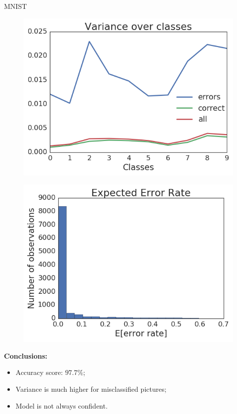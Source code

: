 \documentclass{beamer}
\begin{document}
\begin{frame}{MNIST}
	\begin{minipage}[t]{0.45\columnwidth}
		\begin{figure}
			\includegraphics[width=1\columnwidth]{pres_pics/mnist_variance}
		\end{figure}
	\end{minipage}
	\hfill
	\begin{minipage}[t]{0.46\columnwidth}
		\begin{figure}
			\includegraphics[width=1\columnwidth]{pres_pics/mnist_eer}
		\end{figure}
	\end{minipage}

	\vfill

	\textbf{Conclusions:}
	\begin{itemize}
		\item Accuracy score: $97.7 \%$;
		\item Variance is much higher for misclassified pictures;
		\item Model is not always confident.
	\end{itemize}
\end{frame}
\end{document}
